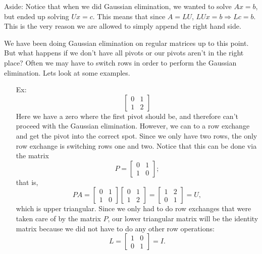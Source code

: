 \documentclass[reqno]{amsart}
\theoremstyle{definition}
\begin{document}
Aside:  Notice that when we did Gaussian elimination, we wanted to solve $Ax = b$, but ended up
solving $Ux = c$.  This means that since $A = LU$, $LUx = b \Rightarrow Lc = b$.  This is the very
reason we are allowed to simply append the right hand side.

We have been doing Gaussian elimination on regular matrices up to this point.  But what happens if we don't have all pivots or our pivots aren't in the right place?  Often we may have to switch rows in order to perform the Gaussian elimination.  Lets look at some examples.

\begin{itemize}

\item[Ex:  ]  
%
\begin{equation*}
\begin{bmatrix}
0 & 1\\
1 & 2
\end{bmatrix}
\end{equation*}
%
Here we have a zero where the first pivot should be, and therefore can't proceed with the Gaussian elimination.  However, we can to a row exchange and get the pivot into the correct spot.  Since we only have two rows, the only row exchange is switching rows one and two.  Notice that this can be done via the matrix
%
\begin{equation*}
P = \begin{bmatrix}
0 & 1\\
1 & 0
\end{bmatrix};
\end{equation*}
%
that is,
%
\begin{equation*}
PA = \begin{bmatrix}
0 & 1\\
1 & 0
\end{bmatrix}\begin{bmatrix}
0 & 1\\
1 & 2
\end{bmatrix} = \begin{bmatrix}
1 & 2\\
0 & 1
\end{bmatrix} = U,
\end{equation*}
%
which is upper triangular.  Since we only had to do row exchanges that were taken care of by the matrix $P$, our lower triangular matrix will be the identity matrix because we did not have to do any other row operations:
%
\begin{equation*}
L = \begin{bmatrix}
1 & 0\\
0 & 1
\end{bmatrix} = I.
\end{equation*}


\end{itemize}
\end{document}

